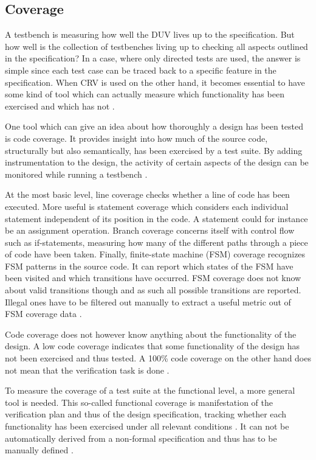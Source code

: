 \subsection{Coverage} %

A testbench is measuring how well the DUV lives up to the specification. But how well is the collection of
testbenches living up to checking all aspects outlined in the specification? In a case, where only directed tests are
used, the answer is simple since each test case can be traced back to a specific feature in the specification. When
CRV is used on the other hand, it becomes essential to have some kind of tool which can actually measure which
functionality has been exercised and which has not \cite[Ch. 15]{mehta2021introduction}.

One tool which can give an idea about how thoroughly a design has been tested is code coverage. It provides insight
into how much of the source code, structurally but also semantically, has been exercised by a test suite. By adding
instrumentation to the design, the activity of certain aspects of the design can be monitored while running a
testbench \cite[Ch. 2]{bergeron2012writing}.

At the most basic level, line coverage checks whether a line of code has been executed. More useful is statement
coverage which considers each individual statement independent of its position in the code. A statement could for
instance be an assignment operation. Branch coverage concerns itself with control flow such as if-statements,
measuring how many of the different paths through a piece of code have been taken. Finally, finite-state machine
(FSM) coverage recognizes FSM patterns in the source code. It can report which states of the FSM have been visited
and which transitions have occurred. FSM coverage does not know about valid transitions though and as such all
possible transitions are reported. Illegal ones have to be filtered out manually to extract a useful metric out of
FSM coverage data \cite[Ch. 15]{mehta2021introduction}.

Code coverage does not however know anything about the functionality of the design. A low code coverage indicates that
some functionality of the design has not been exercised and thus tested. A 100\% code coverage on the other hand does
not mean that the verification task is done \cite[Ch. 2]{bergeron2012writing}.

To measure the coverage of a test suite at the functional level, a more general tool is needed. This so-called
functional coverage is manifestation of the verification plan and thus of the design specification, tracking whether
each functionality has been exercised under all relevant conditions \cite[Sec. 7.6]{flake2020a}. It can not be
automatically derived from a non-formal specification and thus has to be manually defined \cite[Ch. 15]{mehta2021introduction}.

